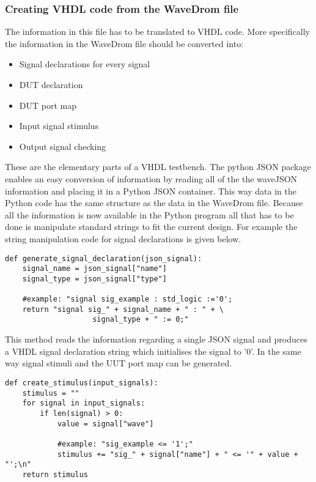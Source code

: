 \subsubsection{Creating VHDL code from the WaveDrom file}\label{TD:vhdl_creation}
The information in this file has to be translated to VHDL code. More specifically the information in the WaveDrom file should be converted into:
\begin{itemize}
	\item Signal declarations for every signal
	\item DUT declaration
	\item DUT port map
	\item Input signal stimulus
	\item Output signal checking
\end{itemize}\noindent
These are the elementary parts of a VHDL testbench. The python JSON package enables an easy conversion of information by reading all of the the waveJSON information and placing it in a Python JSON container. This way data in the Python code has the same structure as the data in the WaveDrom file. Because all the information is now available in the Python program all that has to be done is manipulate standard strings to fit the current design.
\newpage
For example the string manipulation code for signal declarations is given below. 
\begin{lstlisting}[style=python, caption={Generating signal declarations in Python}, label={python:signal_declaration}]
def generate_signal_declaration(json_signal):
	signal_name = json_signal["name"]
	signal_type = json_signal["type"]
	
	#example: "signal sig_example : std_logic :='0';
	return "signal sig_" + signal_name + " : " + \
					signal_type + " := 0;"
\end{lstlisting}\noindent
This method reads the information regarding a single JSON signal and produces a VHDL signal declaration string which initialises the signal to '0'.
\npar
In the same way signal stimuli and the UUT port map can be generated.
\begin{lstlisting}[style=python, caption={Generating signal stimuli in Python}, label={python:signal_stimuli}]
def create_stimulus(input_signals):
	stimulus = ""
	for signal in input_signals:
		if len(signal) > 0:
			value = signal["wave"]
			
			#example: "sig_example <= '1';"
			stimulus += "sig_" + signal["name"] + " <= '" + value + "';\n"
	return stimulus
\end{lstlisting}\noindent
